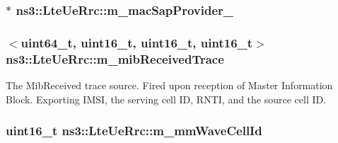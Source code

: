 \subsubsection[{\texorpdfstring{m\+\_\+mac\+Sap\+Provider\+\_\+2}{m_macSapProvider_2}}]{$\ast$ ns3\+::\+Lte\+Ue\+Rrc\+::m\+\_\+mac\+Sap\+Provider\+\_\hspace{0.3cm}{\ttfamily [private]}}\hypertarget{classns3_1_1LteUeRrc_a78400536170ecae9893d5ae8c50bf069}{}\label{classns3_1_1LteUeRrc_a78400536170ecae9893d5ae8c50bf069}
\subsubsection[{\texorpdfstring{m\+\_\+mib\+Received\+Trace}{m_mibReceivedTrace}}]{$<$uint64\+\_\+t, uint16\+\_\+t, uint16\+\_\+t, uint16\+\_\+t$>$ ns3\+::\+Lte\+Ue\+Rrc\+::m\+\_\+mib\+Received\+Trace\hspace{0.3cm}{\ttfamily [private]}}\hypertarget{classns3_1_1LteUeRrc_a1bca18358e1230c8ac2f83a8a5d735b2}{}\label{classns3_1_1LteUeRrc_a1bca18358e1230c8ac2f83a8a5d735b2}
The {\ttfamily Mib\+Received} trace source. Fired upon reception of Master Information Block. Exporting I\+M\+SI, the serving cell ID, R\+N\+TI, and the source cell ID. 
\subsubsection[{\texorpdfstring{m\+\_\+mm\+Wave\+Cell\+Id}{m_mmWaveCellId}}]{\setlength{\rightskip}{0pt plus 5cm}uint16\+\_\+t ns3\+::\+Lte\+Ue\+Rrc\+::m\+\_\+mm\+Wave\+Cell\+Id\hspace{0.3cm}{\ttfamily [private]}}\hypertarget{classns3_1_1LteUeRrc_a28b83564a465159f0cf6d75d4b48d7eb}{}\label{classns3_1_1LteUeRrc_a28b83564a465159f0cf6d75d4b48d7eb}
